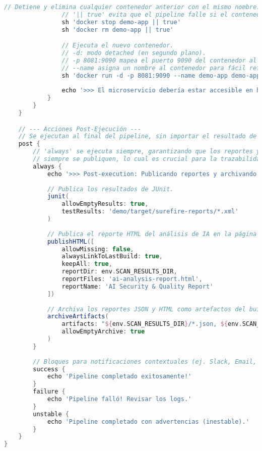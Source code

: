 \begin{lstlisting}[language=groovy, caption={Estructura completa del Jenkinsfile.}, label={lst:jenkinsfile}]
                // Detiene y elimina cualquier contenedor anterior con el mismo nombre.
                // '|| true' evita que el pipeline falle si el contenedor no existe.
                sh 'docker stop demo-app || true'
                sh 'docker rm demo-app || true'

                // Ejecuta el nuevo contenedor.
                // -d: modo detached (en segundo plano).
                // -p 8081:9090 mapea el puerto 9090 del contenedor al 8081 del host.
                // --name asigna un nombre al contenedor para fácil referencia.
                sh 'docker run -d -p 8081:9090 --name demo-app demo-app'
                
                echo '>>> El microservicio debería estar accesible en http://localhost:8081'
            }
        }
    }

    // --- Acciones Post-Ejecución ---
    // Se ejecutan al final del pipeline, sin importar el resultado de las etapas.
    post {
        // 'always' se ejecuta siempre, garantizando que los reportes y artefactos
        // siempre se publiquen, lo cual es crucial para la trazabilidad y el análisis de fallos.
        always {
            echo '>>> Post-execution: Publicando reportes y archivando artefactos...'
            
            // Publica los resultados de JUnit.
            junit(
                allowEmptyResults: true, 
                testResults: 'demo/target/surefire-reports/*.xml'
            )
            
            // Publica el reporte HTML del análisis de IA en la página del build.
            publishHTML([
                allowMissing: false,
                alwaysLinkToLastBuild: true,
                keepAll: true,
                reportDir: env.SCAN_RESULTS_DIR,
                reportFiles: 'ai-analysis-report.html',
                reportName: 'AI Security & Quality Report'
            ])
            
            // Archiva los reportes JSON y HTML como artefactos del build para su descarga.
            archiveArtifacts(
                artifacts: "${env.SCAN_RESULTS_DIR}/*.json, ${env.SCAN_RESULTS_DIR}/*.html",
                allowEmptyArchive: true
            )
        }
        
        // Bloques para notificaciones contextuales (ej. Slack, Email, Teams).
        success {
            echo 'Pipeline completado exitosamente!'
        }
        failure {
            echo 'Pipeline falló! Revisar los logs.'
        }
        unstable {
            echo 'Pipeline completado con advertencias (inestable).'
        }
    }
}
\end{lstlisting}


